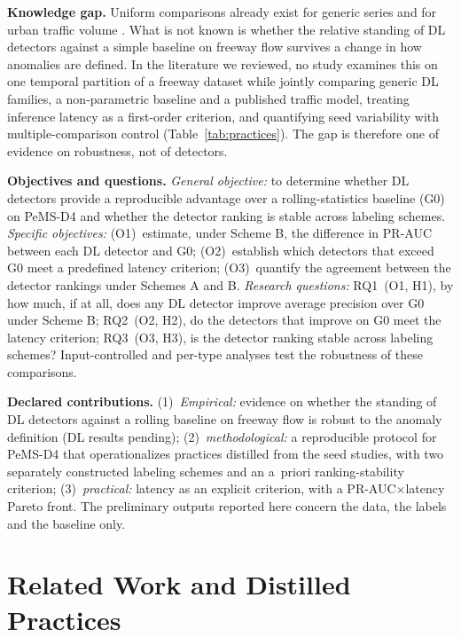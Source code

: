 \documentclass[conference]{IEEEtran}
\begin{document}
\textbf{Knowledge gap.} Uniform comparisons already exist for generic series
\cite{schmidl2022anomaly,liu2024elephant} and for urban traffic volume
\cite{taheri2026applicability}. What is not known is whether the relative
standing of DL detectors against a simple baseline on freeway flow survives a
change in how anomalies are defined. In the literature we reviewed, no study
examines this on one temporal partition of a freeway dataset while jointly
comparing generic DL families, a non-parametric baseline and a published
traffic model, treating inference latency as a first-order criterion, and
quantifying seed variability with multiple-comparison control
(Table~\ref{tab:practices}). The gap is therefore one of evidence on
robustness, not of detectors.

\textbf{Objectives and questions.} \emph{General objective:} to determine
whether DL detectors provide a reproducible advantage over a rolling-statistics
baseline (G0) on PeMS-D4 and whether the detector ranking is stable across
labeling schemes. \emph{Specific objectives:} (O1)~estimate, under Scheme B,
the difference in PR-AUC between each DL detector and G0; (O2)~establish
which detectors that exceed G0 meet a predefined latency criterion;
(O3)~quantify the agreement between the detector rankings under Schemes A
and B. \emph{Research questions:} RQ1~(O1, H1), by how much, if at all, does
any DL detector improve average precision over G0 under Scheme B; RQ2~(O2,
H2), do the detectors that improve on G0 meet the latency criterion; RQ3~(O3,
H3), is the detector ranking stable across labeling schemes? Input-controlled
and per-type analyses test the robustness of these comparisons.

\textbf{Declared contributions.} (1)~\emph{Empirical:} evidence on whether
the standing of DL detectors against a rolling baseline on freeway flow is
robust to the anomaly definition (DL results pending); (2)~\emph{methodological:}
a reproducible protocol for PeMS-D4 that operationalizes practices distilled
from the seed studies, with two separately constructed labeling schemes and
an a~priori ranking-stability criterion; (3)~\emph{practical:} latency as an
explicit criterion, with a PR-AUC$\times$latency Pareto front. The
preliminary outputs reported here concern the data, the labels and the
baseline only.

\section{Related Work and Distilled Practices}
\end{document}
